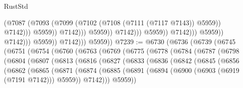 \begin{lexlean}{RustStd}
\begin{coremodule}
                                                          (@7087
                                                            (@7093
                                                              (@7099
                                                                (@7102
                                                                  (@7108
                                                                    (@7111 (@7117 @7143))
                                                                    @5959))
                                                                @7142)))
                                                          @5959))
                                                      @7142)))
                                                @5959))
                                            @7142)))
                                      @5959))
                                  @7142)))
                            @5959))
                        @7142)))
                  @5959))
              @7142)))
        @5959))
@7239 := @6730
    (@6736
      (@6739
        (@6745
          (@6751
            (@6754
              (@6760
                (@6763
                  (@6769
                    (@6775
                      (@6778
                        (@6784
                          (@6787
                            (@6798
                              (@6804
                                (@6807
                                  (@6813
                                    (@6816
                                      (@6827
                                        (@6833
                                          (@6836
                                            (@6842
                                              (@6845
                                                (@6856
                                                  (@6862
                                                    (@6865
                                                      (@6871
                                                        (@6874
                                                          (@6885
                                                            (@6891
                                                              (@6894
                                                                (@6900
                                                                  (@6903 (@6919 (@7191 @7142)))
                                                                  @5959))
                                                              @7142)))
                                                        @5959))

\end{coremodule}
\end{lexlean}
